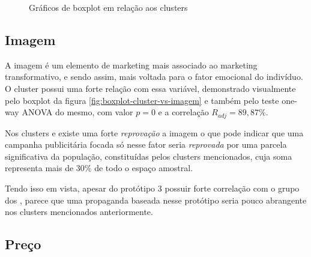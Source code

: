 \begin{figure}[h]
\begin{centering}
\par\end{centering}

\caption{Gráficos de boxplot em relação aos clusters}
\end{figure}

\subsection{Imagem}

A imagem é um elemento de marketing mais associado ao marketing transformativo,
e sendo assim, mais voltada para o fator emocional do indivíduo. O
cluster \emph{\nomeCb{}} possui uma forte relação com essa variável,
demonstrado visualmente pelo boxplot da figura \ref{fig:boxplot-cluster-vs-imagem}
e também pelo teste one-way ANOVA do mesmo, com valor $p=0$ e a correlação
$R_{adj}=89,87\%$.

Nos clusters \emph{\nomeCc{}} e \emph{\nomeCd{} }existe uma forte
\emph{reprovação }a imagem o que pode indicar que uma campanha publicitária
focada só nesse fator seria \emph{reprovada }por uma parcela significativa
da população, constituídas pelos clusters mencionados, cuja soma representa
mais de 30\% de todo o espaço amostral.

Tendo isso em vista, apesar do protótipo 3 possuir forte correlação
com o grupo dos \emph{\nomeCb{}}, parece que uma propaganda baseada
nesse protótipo seria pouco abrangente nos clusters mencionados anteriormente. 

\subsection{Preço}

